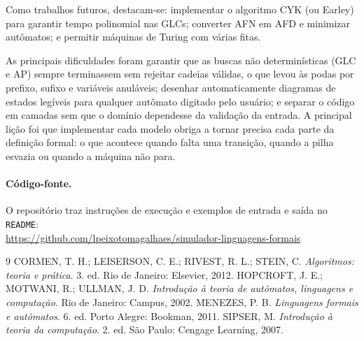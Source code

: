 \documentclass[12pt,a4paper]{article}
\newcommand{\cod}[1]{\texttt{#1}}
\begin{document}
Como trabalhos futuros, destacam-se: implementar o algoritmo CYK (ou Earley)
para garantir tempo polinomial nas GLCs; converter AFN em AFD e minimizar
autômatos; e permitir máquinas de Turing com várias fitas.

As principais dificuldades foram garantir que as buscas não determinísticas
(GLC e AP) sempre terminassem sem rejeitar cadeias válidas, o que levou às
podas por prefixo, sufixo e variáveis anuláveis; desenhar automaticamente
diagramas de estados legíveis para qualquer autômato digitado pelo usuário; e
separar o código em camadas sem que o domínio dependesse da validação da
entrada. A principal lição foi que implementar cada modelo obriga a tornar
precisa cada parte da definição formal: o que acontece quando falta uma
transição, quando a pilha esvazia ou quando a máquina não para.

\paragraph{Código-fonte.} O repositório traz instruções de execução e
exemplos de entrada e saída no \cod{README}:\\
\url{https://github.com/lpeixotomagalhaes/simulador-linguagens-formais}

\begingroup\small{}
\begin{thebibliography}{9}
   CORMEN, T. H.; LEISERSON, C. E.; RIVEST, R. L.; STEIN, C.
    \textit{Algoritmos: teoria e prática}. 3. ed. Rio de Janeiro: Elsevier, 2012.
   HOPCROFT, J. E.; MOTWANI, R.; ULLMAN, J. D.
    \textit{Introdução à teoria de autômatos, linguagens e computação}.
    Rio de Janeiro: Campus, 2002.
   MENEZES, P. B. \textit{Linguagens formais e autômatos}.
    6. ed. Porto Alegre: Bookman, 2011.
   SIPSER, M. \textit{Introdução à teoria da computação}.
    2. ed. São Paulo: Cengage Learning, 2007.
\end{thebibliography}
\endgroup
\end{document}
